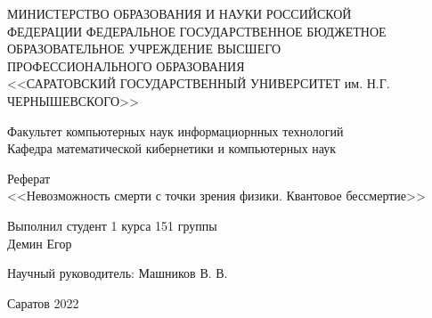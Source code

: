 \thispagestyle{empty}
    \begin{center}
        МИНИСТЕРСТВО ОБРАЗОВАНИЯ И НАУКИ РОССИЙСКОЙ \\
        ФЕДЕРАЦИИ ФЕДЕРАЛЬНОЕ ГОСУДАРСТВЕННОЕ БЮДЖЕТНОЕ \\ 
        ОБРАЗОВАТЕЛЬНОЕ УЧРЕЖДЕНИЕ ВЫСШЕГО \\
        ПРОФЕССИОНАЛЬНОГО ОБРАЗОВАНИЯ \\
        <<САРАТОВСКИЙ ГОСУДАРСТВЕННЫЙ УНИВЕРСИТЕТ им. Н.Г.\\
        ЧЕРНЫШЕВСКОГО>>
      \vspace*{42pt}

       Факультет компьютерных наук информациорнных технологий \\
       Кафедра математической кибернетики и компьютерных наук
      \vspace*{112pt}

       Реферат\\
       <<Невозможность смерти с точки зрения физики. Квантовое бессмертие>>
      \vspace*{112pt}      
  \end{center}

  \begin{flushright}
    Выполнил студент 1 курса 151 группы \\
    Демин Егор
    \vspace*{14pt}

    Научный руководитель: Машников В. В.\\
  \end{flushright}
  \vspace*{140pt}

  \centering
  Саратов 2022